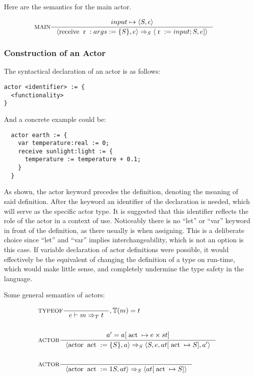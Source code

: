 Here are the semantics for the main actor.

\begin{align*}
&\inference[$\text{MAIN}$]{input \mapsto \Braket{S,\epsilon}}
                          {\Braket{\Treceive \Tr:args := \{S\},e} \Rightarrow_S \Braket{\Tr := input;S, e]}}
\end{align*}

\subsubsection{Construction of an Actor}
\label{sub:constructionOfAnActor}

The syntactical declaration of an actor is as follows:

\begin{lstlisting}
actor <identifier> := {
  <functionality>
}
\end{lstlisting}

And a concrete example could be:

\begin{verbatim}
  actor earth := {
    var temperature:real := 0;
    receive sunlight:light := {
      temperature := temperature + 0.1;
    }
  }
\end{verbatim}

As shown, the actor keyword precedes the definition, denoting the meaning of said definition. After the keyword an identifier of the declaration is needed, which will serve as the specific actor type. It is suggested that this identifier reflects the role of the actor in a context of use. Noticeably there is no \enquote{let} or \enquote{var} keyword in front of the definition, as there usually is when assigning. This is a deliberate choice since \enquote{let} and \enquote{var} implies interchangeability, which is not an option is this case. If variable declaration of actor definitions were possible, it would effectively be the equivalent of changing the definition of a type on run-time, which would make little sense, and completely undermine the type safety in the language.

Some general semantics of actors:

\begin{align*}
&\inference[TYPEOF]{}
                  {e \vdash m \Rightarrow_T t}
                  {, \mathbb{T}(m) = t}
\\\\
&\inference[$\text{ACTOR}$]{a' = a[\Tact \mapsto e \times st]}
                           {\Braket{\Tactor \Tact := \{S\}, a} \Rightarrow_S \Braket{S,e,at[\Tact \mapsto S],a'}}
\\\\
&\inference[$\text{ACTOR}$]{}
                           {\Braket{\Tactor \Tact := 1S, at} \Rightarrow_S \Braket{at[\Tact \mapsto S]}}
\end{align*}

